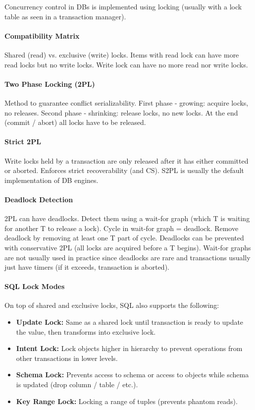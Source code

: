 Concurrency control in DBs is implemented using locking (usually with a lock table as seen in a transaction manager).

\paragraph{Compatibility Matrix}
Shared (read) vs. exclusive (write) locks. Items with read lock can have more read locks but no write locks. Write lock can have no more read nor write locks.

\paragraph{Two Phase Locking (2PL)}
Method to guarantee conflict serializability. First phase - growing: acquire locks, no releases. Second phase - shrinking: release locks, no new locks. At the end (commit / abort) all locks have to be released.

\paragraph{Strict 2PL}
Write locks held by a transaction are only released after it has either committed or aborted. Enforces strict recoverability (and CS). S2PL is usually the default implementation of DB engines.

\paragraph{Deadlock Detection}
2PL can have deadlocks. Detect them using a wait-for graph (which T is waiting for another T to release a lock). Cycle in wait-for graph = deadlock. Remove deadlock by removing at least one T part of cycle. Deadlocks can be prevented with conservative 2PL (all locks are acquired before a T begins). Wait-for graphs are not usually used in practice since deadlocks are rare and transactions usually just have timers (if it exceeds, transaction is aborted).

\paragraph{SQL Lock Modes}
On top of shared and exclusive locks, SQL also supports the following:
\begin{itemize}
    \item \textbf{Update Lock:} Same as a shared lock until transaction is ready to update the value, then transforms into exclusive lock.
    \item \textbf{Intent Lock:} Lock objects higher in hierarchy to prevent operations from other transactions in lower levels.
    \item \textbf{Schema Lock:} Prevents access to schema or access to objects while schema is updated (drop column / table / etc.).
    \item \textbf{Key Range Lock:} Locking a range of tuples (prevents phantom reads).
\end{itemize}

